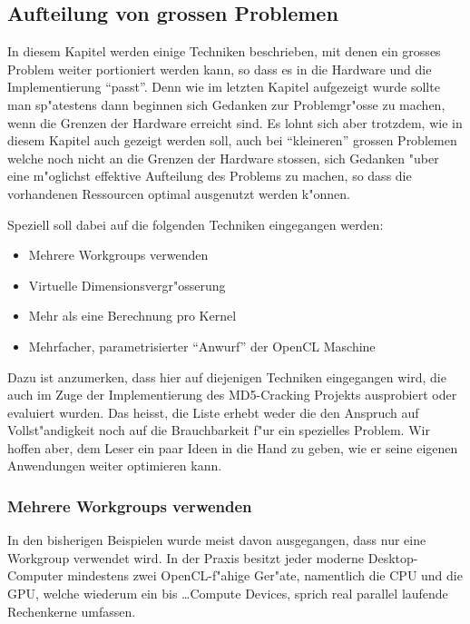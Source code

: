 \begin{refsection}
\subsection{Aufteilung von grossen Problemen}

In diesem Kapitel werden einige Techniken beschrieben, mit denen ein 
grosses Problem weiter portioniert werden kann, so dass es in die 
Hardware und die Implementierung ``passt''. 
Denn wie im letzten Kapitel aufgezeigt wurde sollte man sp"atestens dann
beginnen sich Gedanken zur Problemgr"osse zu machen, wenn die 
Grenzen der Hardware erreicht sind. Es lohnt sich aber trotzdem, wie in diesem 
Kapitel auch gezeigt werden soll, auch bei ``kleineren'' grossen Problemen
welche noch nicht an die Grenzen der Hardware stossen, sich Gedanken
"uber eine m"oglichst effektive Aufteilung des Problems zu machen, so
dass die vorhandenen Ressourcen optimal  ausgenutzt werden k"onnen.

Speziell soll dabei auf die folgenden Techniken eingegangen werden:

\begin{itemize}
 \item Mehrere Workgroups verwenden
 \item Virtuelle Dimensionsvergr"osserung
 \item Mehr als eine Berechnung pro Kernel
 \item Mehrfacher, parametrisierter ``Anwurf'' der OpenCL Maschine
\end{itemize}

Dazu ist anzumerken, dass hier auf diejenigen Techniken eingegangen
wird, die auch im Zuge der Implementierung des MD5-Cracking Projekts
ausprobiert oder evaluiert wurden. Das heisst, die Liste erhebt weder
die den Anspruch auf Vollst"andigkeit noch auf die Brauchbarkeit f"ur
ein spezielles Problem. Wir hoffen aber, dem Leser ein paar Ideen
in die Hand zu geben, wie er seine eigenen Anwendungen weiter optimieren 
kann.


\subsubsection{Mehrere Workgroups verwenden}

In den bisherigen Beispielen wurde meist davon ausgegangen,
dass nur eine Workgroup verwendet wird. In der Praxis besitzt jeder
moderne Desktop-Computer mindestens zwei OpenCL-f"ahige Ger"ate, 
namentlich die CPU und die GPU, welche wiederum ein bis \ldots Compute
Devices, sprich real parallel laufende Rechenkerne umfassen.


\end{refsection}

